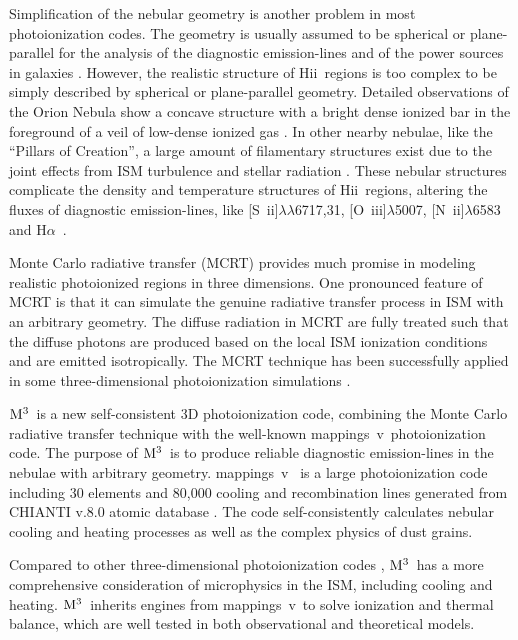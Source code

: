 \documentclass[twocolumn]{aastex62}
\newcommand{\ha}{H$\alpha$}    %
\newcommand{\sii}{[S~{\sc ii}]}
\newcommand{\oiii}{[O~{\sc iii}]}
\newcommand{\nii}{[N~{\sc ii}]}
\newcommand{\newcode}{{$\rm M^3$}}
\newcommand{\mappings}{{\sc mappings~v}}
\newcommand{\hiireg}{{H{\sc ii}}}
\begin{document}
\begin{CJK*}{UTF8}{gbsn}
Simplification of the nebular geometry is another problem in most photoionization codes.
The geometry is usually assumed to be spherical or plane-parallel for the analysis of the diagnostic emission-lines \citep{Kobulnicky-2004,Levesque-2010} and of the power sources in galaxies \citep{Kewley-2001}.
However, the realistic structure of \hiireg\ regions is too complex to be simply described by spherical or plane-parallel geometry.
Detailed observations of the Orion Nebula show a concave structure with a bright dense ionized bar in the foreground of a veil of low-dense ionized gas \citep{Zuckerman-1973,O'Dell-2009}.
In other nearby nebulae, like the ``Pillars of Creation'', a large amount of filamentary structures exist \citep{Schneider-2016} due to the joint effects from ISM turbulence and stellar radiation \citep{Gritschneder-2010,Tremblin-2013}.
These nebular structures complicate the density and temperature structures of \hiireg\ regions, altering the fluxes of diagnostic emission-lines, like \sii$\lambda\lambda$6717,31, \oiii$\lambda$5007, \nii$\lambda$6583 and \ha\ \citep{Kewley-2019}.

Monte Carlo radiative transfer (MCRT) provides much promise in modeling realistic photoionized regions in three dimensions. 
One pronounced feature of MCRT is that it can simulate the genuine radiative transfer process in ISM with an arbitrary geometry.
The diffuse radiation in MCRT are fully treated such that the diffuse photons are produced based on the local ISM ionization conditions and are emitted isotropically.
The MCRT technique has been successfully applied in some three-dimensional photoionization simulations \citep{Ercolano-2003}. 

\newcode\ is a new self-consistent 3D photoionization code, combining the Monte Carlo radiative transfer technique with the well-known \mappings\ photoionization code.
The purpose of \newcode\ is to produce reliable diagnostic emission-lines in the nebulae with arbitrary geometry. 
\mappings\ \citep{Binette-1985,Sutherland-1993,Sutherland-2018} is a large photoionization code including 30 elements and 80,000 cooling and recombination lines generated from CHIANTI v.8.0 atomic database \citep{Del Zanna-2015}.
The code self-consistently calculates nebular cooling and heating processes as well as the complex physics of dust grains.

Compared to other three-dimensional photoionization codes \citep{Ercolano-2003,Wood-2004,Vandenbroucke-2018}, \newcode\ has a more comprehensive consideration of microphysics in the ISM, including cooling and heating. 
\newcode\ inherits engines from \mappings\ to solve ionization and thermal balance, which are well tested in both observational and theoretical models.


\end{CJK*}
\end{document}
